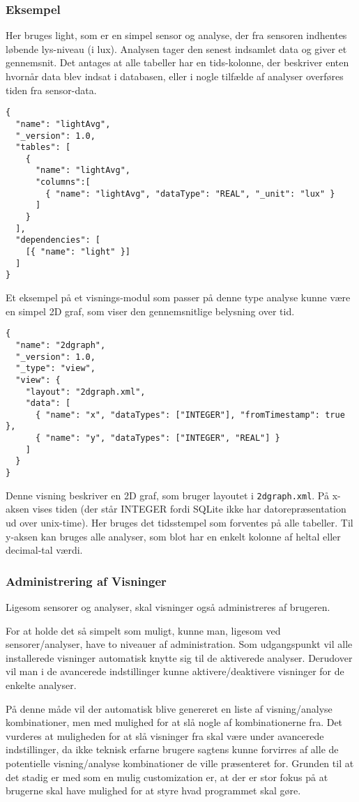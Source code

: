 \subsubsection{Eksempel}
Her bruges light, som er en simpel sensor og analyse, der fra sensoren indhentes løbende lys-niveau (i lux).
Analysen tager den senest indsamlet data og giver et gennemsnit.
Det antages at alle tabeller har en tids-kolonne, der beskriver enten hvornår data blev indsat i databasen, eller i nogle tilfælde af analyser overføres tiden fra sensor-data.

\begin{lstlisting}
{
  "name": "lightAvg",
  "_version": 1.0,
  "tables": [
    {
      "name": "lightAvg",
      "columns":[
        { "name": "lightAvg", "dataType": "REAL", "_unit": "lux" }
      ]
    }
  ],
  "dependencies": [
    [{ "name": "light" }]
  ]
}
\end{lstlisting}

Et eksempel på et visnings-modul som passer på denne type analyse kunne være en simpel 2D graf, som viser den gennemsnitlige belysning over tid.

\begin{lstlisting}
{
  "name": "2dgraph",
  "_version": 1.0,
  "_type": "view",
  "view": {
    "layout": "2dgraph.xml",
    "data": [
      { "name": "x", "dataTypes": ["INTEGER"], "fromTimestamp": true },
      { "name": "y", "dataTypes": ["INTEGER", "REAL"] }
    ]
  }
}
\end{lstlisting}
 
Denne visning beskriver en 2D graf, som bruger layoutet i \texttt{2dgraph.xml}.
På x-aksen vises tiden (der står INTEGER fordi SQLite ikke har datorepræsentation ud over unix-time).
Her bruges det tidsstempel som forventes på alle tabeller.
Til y-aksen kan bruges alle analyser, som blot har en enkelt kolonne af heltal eller decimal-tal værdi.

\subsubsection{Administrering af Visninger}
Ligesom sensorer og analyser, skal visninger også administreres af brugeren.

For at holde det så simpelt som muligt, kunne man, ligesom ved sensorer/analyser, have to niveauer af administration.
Som udgangspunkt vil alle installerede visninger automatisk knytte sig til de aktiverede analyser.
Derudover vil man i de avancerede indstillinger kunne aktivere/deaktivere visninger for de enkelte analyser.

På denne måde vil der automatisk blive genereret en liste af visning/analyse kombinationer, men med mulighed for at slå nogle af kombinationerne fra.
Det vurderes at muligheden for at slå visninger fra skal være under avancerede indstillinger, da ikke teknisk erfarne brugere sagtens kunne forvirres af alle de potentielle visning/analyse kombinationer de ville præsenteret for.
Grunden til at det stadig er med som en mulig customization er, at der er stor fokus på at brugerne skal have mulighed for at styre hvad programmet skal gøre. 
